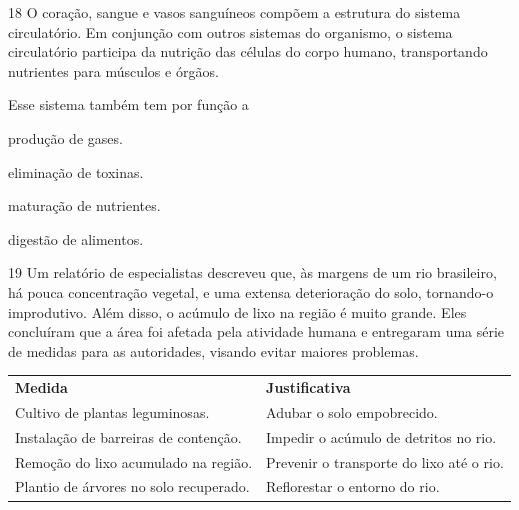 

\num{18} O coração, sangue e vasos sanguíneos compõem a estrutura do
sistema circulatório. Em conjunção com outros sistemas do organismo, o
sistema circulatório participa da nutrição das células do corpo humano,
transportando nutrientes para músculos e órgãos.

Esse sistema também tem por função a

\begin{minipage}{.5\textwidth}
\begin{escolha}
\item produção de gases.

\item eliminação de toxinas.

\item maturação de nutrientes.

\item digestão de alimentos.
\end{escolha}
\end{minipage}

\num{19} Um relatório de especialistas descreveu que, às margens de
um rio brasileiro, há pouca concentração vegetal, e uma extensa
deterioração do solo, tornando-o improdutivo. Além disso, o acúmulo de
lixo na região é muito grande. Eles concluíram que a área foi afetada
pela atividade humana e entregaram uma série de medidas para as
autoridades, visando evitar maiores problemas.

\begin{longtable}[]{@{}ll@{}}
\toprule
\textbf{Medida} & \textbf{Justificativa}\tabularnewline
Cultivo de plantas leguminosas. & Adubar o solo
empobrecido.\tabularnewline
Instalação de barreiras de contenção. & Impedir o acúmulo de detritos no
rio.\tabularnewline
Remoção do lixo acumulado na região. & Prevenir o transporte do lixo até
o rio.\tabularnewline
Plantio de árvores no solo recuperado. & Reflorestar o entorno do
rio.\tabularnewline
\bottomrule
\end{longtable}

